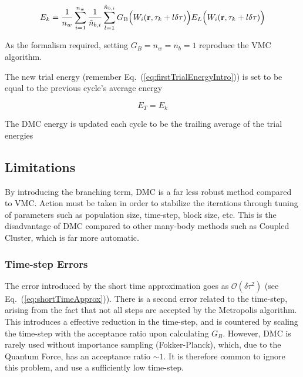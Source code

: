 \begin{equation}
 E_k = \frac{1}{n_w}\sum_{i=1}^{n_w} \frac{1}{\tilde n_{b,i}}\sum_{l=1}^{\tilde n_{b,i}} G_\mathrm{B}\Big(W_i(\mathbf{r}, \tau_k + l\delta\tau)\Big)E_L\Big(W_i(\mathbf{r}, \tau_k + l\delta\tau)\Big)
\end{equation}

As the formalism required, setting $G_B = n_w = n_b = 1$ reproduce the VMC algorithm. 

The new trial energy (remember Eq.~(\ref{eq:firstTrialEnergyIntro})) is set to be equal to the previous cycle's average energy  

\begin{equation}
 E_T = E_k
\end{equation}

The DMC energy is updated each cycle to be the trailing average of the trial energies





\subsection{Limitations}
\label{sec:DMClimitations}

By introducing the branching term, DMC is a far less robust method compared to VMC. Action must be taken in order to stabilize the iterations through tuning of parameters such as population size, time-step, block size, etc. This is the disadvantage of DMC compared to other many-body methods such as Coupled Cluster, which is far more automatic.

\subsubsection{Time-step Errors}

The error introduced by the short time approximation goes as $\mathcal{O}(\delta\tau^2)$ (see Eq.~(\ref{eq:shortTimeApprox})). There is a second error related to the time-step, arising from the fact that not all steps are accepted by the Metropolis algorithm. This introduces a effective reduction in the time-step, and is countered by scaling the time-step with the acceptance ratio upon calculating $G_B$. However, DMC is rarely used without importance sampling (Fokker-Planck), which, due to the Quantum Force, has an acceptance ratio $\sim 1$. It is therefore common to ignore this problem, and use a sufficiently low time-step.

